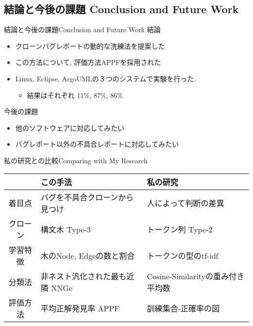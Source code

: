 \subsection{結論と今後の課題 Conclusion and Future Work}
\begin{frame}{結論と今後の課題}{Conclusion and Future Work}
結論
\begin{itemize}
\item クローンバグレポートの動的な洗練法を提案した
\item この方法について, 評価方法APPFを採用された
\item Linux, Eclipse, ArgoUMLの３つのシステムで実験を行った.
    \begin{itemize}
    \item 結果はそれぞれ 11\%, 87\%, 86\%
    \end{itemize}
\end{itemize}
今後の課題
\begin{itemize}
\item 他のソフトウェアに対応してみたい
\item バグレポート以外の不具合レポートに対応してみたい
\end{itemize}
\end{frame}

\appendix
\backupbegin

\begin{frame}{私の研究との比較}{Comparing with My Research}
\begin{tabularx}{23em}{c|XX}
             &この手法&私の研究\\
\hline
着目点       &バグを不具合クローンから見つけ & 人によって判断の差異\\
クローン     &構文木 Type-3  & トークン列 Type-2  \\
学習特徴 &木のNode, Edgeの数と割合& トークンの型のtf-idf\\
分類法       &非ネスト汎化された最も近隣 NNGe
&Cosine-Similarityの重み付き平均数\\
評価方法     &平均正解発見率 APPF & 訓練集合-正確率の図\\

\end{tabularx}
\end{frame}

